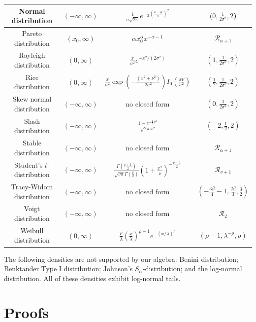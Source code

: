 \documentclass[thesis.tex]{subfiles}
\begin{document}
\begin{longtable}{|c|c|c|c|}
Normal distribution & $(-\infty,\infty)$ & $\frac{1}{\sigma\sqrt{2\pi}}e^{-\frac{1}{2}(\frac{x-\mu}{\sigma})^{2}}$ & $(0,\frac{1}{2\sigma^{2}},2$)\tabularnewline
\hline 
Pareto distribution & $(x_{0},\infty)$ & $\alpha x_{0}^{\alpha}x^{-\alpha-1}$ & $\mathcal{R}_{\alpha+1}$\tabularnewline
\hline 
Rayleigh distribution & $(0,\infty)$ & $\frac{x}{\sigma^{2}}e^{-x^{2}/(2\sigma^{2})}$ & $(1,\frac{1}{2\sigma^{2}},2)$\tabularnewline
\hline 
Rice distribution & $(0,\infty)$ & $\frac{x}{\sigma^{2}}\exp\left(-\frac{(x^{2}+\nu^{2})}{2\sigma^{2}}\right)I_{0}\left(\frac{x\nu}{\sigma^{2}}\right)$ & $(\frac{1}{2},\frac{1}{2\sigma^{2}},2)$\tabularnewline
\hline 
Skew normal distribution & $(-\infty,\infty)$ & no closed form & $(0,\frac{1}{2\sigma^{2}},2)$\tabularnewline
\hline 
Slash distribution & $(-\infty,\infty)$ & $\frac{1-e^{-\frac{1}{2}x^{2}}}{\sqrt{2\pi}x^{2}}$ & $(-2,\frac{1}{2},2)$\tabularnewline
\hline 
Stable distribution & $(-\infty,\infty)$ & no closed form & $\mathcal{R}_{\alpha+1}$\tabularnewline
\hline 
Student's $t$-distribution & $(-\infty,\infty)$ & $\frac{\Gamma(\frac{\nu+1}{2})}{\sqrt{\nu\pi}\Gamma(\frac{\nu}{2})}\left(1+\frac{x^{2}}{\nu}\right)^{-\frac{\nu+1}{2}}$ & $\mathcal{R}_{\nu+1}$\tabularnewline
\hline 
Tracy-Widom distribution & $(-\infty,\infty)$ & no closed form & $(-\frac{3\beta}{4}-1,\frac{2\beta}{3},\frac{3}{2})$\tabularnewline
\hline 
Voigt distribution & $(-\infty,\infty)$ & no closed form & $\mathcal{R}_{2}$\tabularnewline
\hline 
Weibull distribution & $(0,\infty)$ & $\frac{\rho}{\lambda}\left(\frac{x}{\lambda}\right)^{\rho-1}e^{-(x/\lambda)^{\rho}}$ & $(\rho-1,\lambda^{-\rho},\rho)$\tabularnewline
\hline 
\end{longtable}
\egroup

The following densities are not supported by our algebra: Benini distribution; Benktander Type I distribution; Johnson's $S_U$-distribution; and the log-normal distribution. All of these densities exhibit log-normal tails.

\section{Proofs}\label{sec:proofs}
\end{document}
